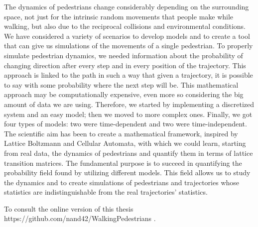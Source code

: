 \documentclass{standalone}
\begin{document}
The dynamics of pedestrians change considerably depending on the surrounding space, not just for the intrinsic random movements that people make while walking, but also due to the reciprocal collisions and environmental conditions. 
We have considered a variety of scenarios to develop models and to create a tool that can give us simulations of the movements of a single pedestrian. 
To properly simulate pedestrian dynamics, we needed information about the probability of changing direction after every step and in every position of the trajectory. 
This approach is linked to the path in such a way that given a trajectory, it is possible to say with some probability where the next step will be. 
This mathematical approach may be computationally expensive, even more so considering the big amount of data we are using. 
Therefore, we started by implementing a discretized system and an easy model; then we moved to more complex ones. 
Finally, we got four types of models: two were time-dependent and two were time-independent. 
The scientific aim has been to create a mathematical framework, inspired by Lattice Boltzmann and Cellular Automata, with which we could learn, starting from real data, the dynamics of pedestrians and quantify them in terms of lattice transition matrices. 
The fundamental purpose is to succeed in quantifying the probability field found by utilizing different models. 
This field allows us to study the dynamics and to create simulations of pedestrians and trajectories whose statistics are indistinguishable from the real trajectories’ statistics.

\vspace*{13.5cm}

To consult the online version of this thesis \quad https://github.com/nand42/WalkingPedestrians  .
\end{document}
